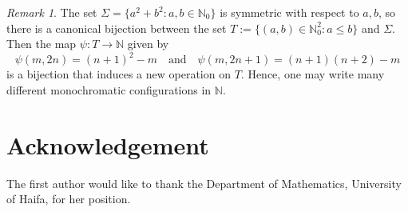 \documentclass[12pt]{amsart}
\theoremstyle{plain}
\theoremstyle{definition}
\theoremstyle{remark}
\newtheorem{remark}[theorem]{Remark}
\numberwithin{equation}{section}
\begin{document}
\begin{remark}
The set \( \Sigma = \{ a^2 + b^2 : a, b \in \mathbb{N}_0 \} \) is symmetric with respect to \( a, b \), so there is a canonical bijection between the set \( T := \{(a, b) \in \mathbb{N}_0^2 : a \leq b \} \) and \( \Sigma \). Then the map \( \psi : T \to \mathbb{N} \) given by
\[
\psi(m, 2n) = (n+1)^2 - m \quad \text{and} \quad \psi(m, 2n+1) = (n+1)(n+2) - m
\]
is a bijection that induces a new operation on \( T \). Hence, one may write many different monochromatic configurations in \( \mathbb{N} \).
\end{remark}

\section*{Acknowledgement}The first author would like to thank the Department of Mathematics, University of Haifa, for her position.
\end{document}
